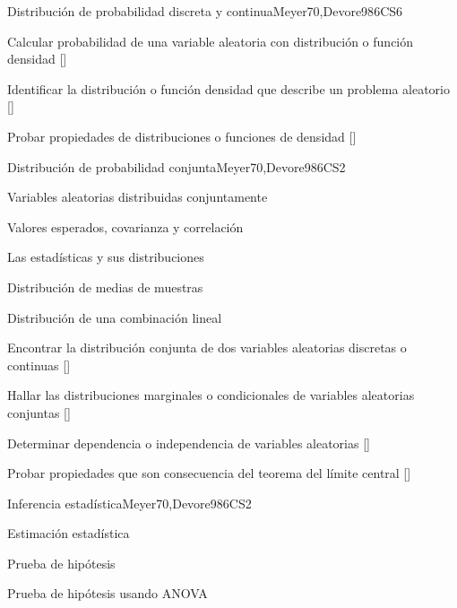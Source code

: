 \begin{syllabus}
\begin{unit}{}{Distribución de probabilidad discreta y continua}{Meyer70,Devore98}{6}{CS6}
   \begin{learningoutcomes}
      \item Calcular probabilidad de una variable aleatoria con distribución o función densidad [\Usage]
      \item Identificar la distribución o función densidad que describe un problema aleatorio [\Usage]
      \item Probar propiedades de distribuciones o funciones de densidad [\Usage]
   \end{learningoutcomes}
\end{unit}

\begin{unit}{}{Distribución de probabilidad conjunta}{Meyer70,Devore98}{6}{CS2}
\begin{topics}
      \item Variables aleatorias distribuidas conjuntamente 
      \item Valores esperados, covarianza y correlación
      \item Las estadísticas y sus distribuciones
      \item Distribución de medias de muestras
      \item Distribución de una combinación lineal

   \end{topics}
   \begin{learningoutcomes}
      \item Encontrar la distribución conjunta de dos variables aleatorias discretas o continuas [\Usage]
      \item Hallar las distribuciones marginales o condicionales de variables aleatorias conjuntas [\Usage]
      \item Determinar dependencia o independencia de variables aleatorias [\Usage]
      \item Probar propiedades que son consecuencia del teorema  del límite central [\Usage]
   \end{learningoutcomes}
\end{unit}

\begin{unit}{}{Inferencia estadística}{Meyer70,Devore98}{6}{CS2}
\begin{topics}
      \item Estimación estadística
      \item Prueba de hipótesis
      \item Prueba de hipótesis usando ANOVA
   \end{topics}


\end{unit}
\end{syllabus}

